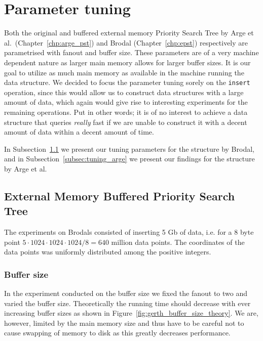 \documentclass[twoside,11pt,openright]{report}
\begin{document}
\section{Parameter tuning}
Both the original and buffered external memory Priority Search Tree by Arge et al.~(Chapter~\ref{chp:arge_pst}) and Brodal (Chapter~\ref{chp:epst}) respectively are parametrised with fanout and buffer size. These parameters are of a very machine dependent nature as larger main memory allows for larger buffer sizes. It is our goal to utilize as much main memory as available in the machine running the data structure. We decided to focus the parameter tuning sorely on the \texttt{insert} operation, since this would allow us to construct data structures with a large amount of data, which again would give rise to interesting experiments for the remaining operations. Put in other words; it is of no interest to achieve a data structure that queries \textit{really} fast if we are unable to construct it with a decent amount of data within a decent amount of time.

In Subsection~\ref{subsec:tuning_gerth} we present our tuning parameters for the structure by Brodal, and in Subsection~\ref{subsec:tuning_arge} we present our findings for the structure by Arge et al.

\subsection{External Memory Buffered Priority Search Tree}
\label{subsec:tuning_gerth}
The experiments on Brodals consisted of inserting 5 Gb of data, i.e. for a $8$ byte point $5 \cdot 1024 \cdot 1024 \cdot 1024 / 8 = 640$ million data points. The coordinates of the data points was uniformly distributed among the positive integers. 

\subsubsection*{Buffer size}

In the experiment conducted on the buffer size we fixed the fanout to two and varied the buffer size. Theoretically the running time should decrease with ever increasing buffer sizes as shown in Figure~\ref{fig:gerth_buffer_size_theory}. We are, however, limited by the main memory size and thus have to be careful not to cause swapping of memory to disk as this greatly decreases performance. 
\end{document}
